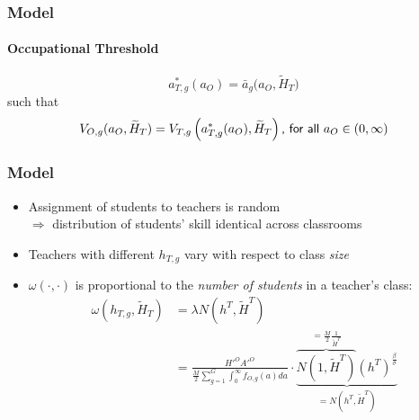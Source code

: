 \documentclass[11pt]{beamer}
\begin{document}
	\begin{frame}
		\frametitle{Model}
		\framesubtitle{Occupational Threshold}
		\begin{equation*}
			a^*_{T,g}(a_O) = \bar{a}_g\big(a_{O},\widetilde{H}_T\big) %
		\end{equation*}
		such that
		\begin{equation}
			\label{eq:indiff}
			V_{O,g}(a_{O},\widetilde{H}_T) = V_{T,g}\left(a^*_{T,g}(a_O),\widetilde{H}_T\right) \textrm{{\sf , for all} } a_O \in (0,\infty) \nonumber
		\end{equation}
	\end{frame}
	
	\begin{frame}
		\frametitle{Model}
		\small
			\begin{itemize}
				\item Assignment of students to teachers is random \\ $\Rightarrow$ distribution of students' skill identical across classrooms
				\item Teachers with different $h_{T,g}$ vary with respect to class {\it size}
				\item $\omega(\cdot,\cdot)$ is proportional to the \textit{number of students} in a teacher's class:
				\begin{align*}
					\omega(h_{T,g},\widetilde{H}_T) & =  \lambda N(h^T,\widetilde{H}^T) \\
					& = \frac{{H'}^O {A'}^O}{\frac{M}{2}\sum_{g=1}^G \int_0^\infty f_{O,g}(a) da} \cdot \underbrace{\overbrace{N(1,\widetilde{H}^T)}^{=\frac{M}{2}\frac{1}{\widetilde{H}^T}}\left( h^T \right)^{\frac{\beta}{\sigma}}}_{=N(h^T,\widetilde{H}^T)} \\

\end{align*}
\end{itemize}
\end{frame}
\end{document}
